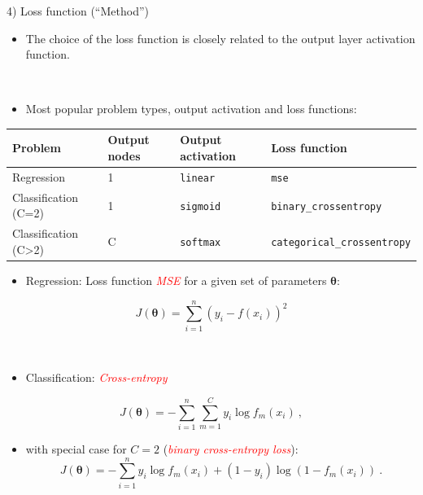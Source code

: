 \documentclass[
  10pt,
  ignorenonframetext,
]{beamer}
\providecommand{\tightlist}{%
  \setlength{\itemsep}{0pt}\setlength{\parskip}{0pt}}
\begin{document}
\begin{frame}[fragile]
\begin{block}{4) Loss function (``Method'')}
\protect\hypertarget{loss-function-method}{}
\(~\)

\begin{itemize}
\tightlist
\item
  The choice of the loss function is closely related to the output layer
  activation function.
\end{itemize}

\(~\)

\begin{itemize}
\tightlist
\item
  Most popular problem types, output activation and loss functions:
\end{itemize}

\scriptsize

\begin{longtable}[]{@{}llll@{}}
\toprule()
Problem & Output nodes & Output activation & Loss function \\
\midrule()
\endhead
Regression & 1 & \texttt{linear} & \texttt{mse} \\
Classification (C=2) & 1 & \texttt{sigmoid} &
\texttt{binary\_crossentropy} \\
Classification (C\textgreater2) & C & \texttt{softmax} &
\texttt{categorical\_crossentropy} \\
\bottomrule()
\end{longtable}
\end{block}
\end{frame}

\begin{frame}
\begin{itemize}
\tightlist
\item
  Regression: Loss function \emph{\textcolor{red}{MSE}} for a given set
  of parameters \(\boldsymbol{\theta}\):
\end{itemize}

\[J({\boldsymbol \theta}) = \sum_{i=1}^n (y_i- f(x_i))^2\]

\(~\)

\begin{itemize}
\tightlist
\item
  Classification: \emph{\textcolor{red}{Cross-entropy}}
\end{itemize}

\[J({\boldsymbol \theta}) = -\sum_{i=1}^n \sum_{m=1}^C y_i \log f_m(x_i) \ ,\]

\begin{itemize}
\tightlist
\item
  with special case for \(C=2\)
  (\emph{\textcolor{red}{binary cross-entropy loss}}):
  \[J({\boldsymbol \theta}) = -\sum_{i=1}^n  y_i \log f_m(x_i) + (1-y_i) \log (1-f_m(x_i)) \ .\]
\end{itemize}
\end{frame}
\end{document}
